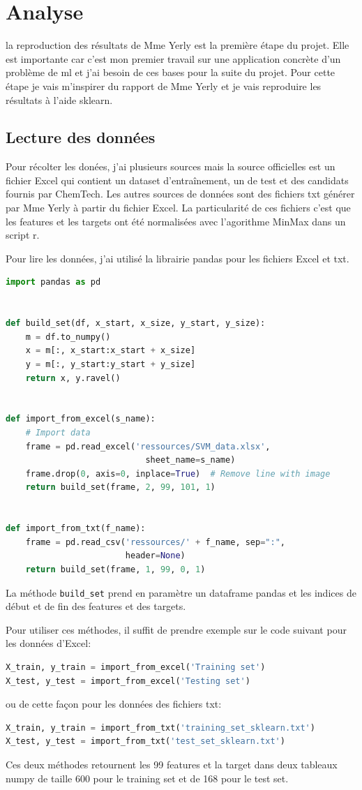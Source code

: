 \chapter{Analyse}
\label{chap:analyse}
la reproduction des résultats de Mme Yerly est la première étape du projet.
Elle est importante car c'est mon premier travail sur une application concrète d'un problème de \acrlong{ml} et j'ai besoin de ces bases pour la suite du projet.
Pour cette étape je vais m'inspirer du rapport\cite{IL_SVM_report} de Mme Yerly et je vais reproduire les résultats à l'aide \acrlong{sklearn}.


\section{Lecture des données}
Pour récolter les donées, j'ai plusieurs sources mais la source officielles est un fichier Excel\cite{SVM_data} qui contient un dataset d'entraînement, un de test et des candidats fournis par ChemTech.
Les autres sources de données sont des fichiers txt générer par Mme Yerly à partir du fichier Excel.
La particularité de ces fichiers c'est que les features et les targets ont été normalisées avec l'agorithme MinMax dans un script \acrshort{r}.

Pour lire les données, j'ai utilisé la librairie \acrfull{pandas} pour les fichiers Excel et txt.
\begin{lstlisting}[language=Python]
import pandas as pd


def build_set(df, x_start, x_size, y_start, y_size):
    m = df.to_numpy()
    x = m[:, x_start:x_start + x_size]
    y = m[:, y_start:y_start + y_size]
    return x, y.ravel()


def import_from_excel(s_name):
    # Import data
    frame = pd.read_excel('ressources/SVM_data.xlsx',
                            sheet_name=s_name)
    frame.drop(0, axis=0, inplace=True)  # Remove line with image
    return build_set(frame, 2, 99, 101, 1)


def import_from_txt(f_name):
    frame = pd.read_csv('ressources/' + f_name, sep=":",
                        header=None)
    return build_set(frame, 1, 99, 0, 1)
\end{lstlisting}
La méthode \texttt{build\_set} prend en paramètre un dataframe \acrshort{pandas} et les indices de début et de fin des features et des targets.

Pour utiliser ces méthodes, il suffit de prendre exemple sur le code suivant pour les données d'Excel:
\begin{lstlisting}[language=Python]
X_train, y_train = import_from_excel('Training set')
X_test, y_test = import_from_excel('Testing set')
\end{lstlisting}
ou de cette façon pour les données des fichiers txt:
\begin{lstlisting}[language=Python]
X_train, y_train = import_from_txt('training_set_sklearn.txt')
X_test, y_test = import_from_txt('test_set_sklearn.txt')
\end{lstlisting}
Ces deux méthodes retournent les 99 features et la target dans deux tableaux numpy de taille 600 pour le training set et de 168 pour le test set.


